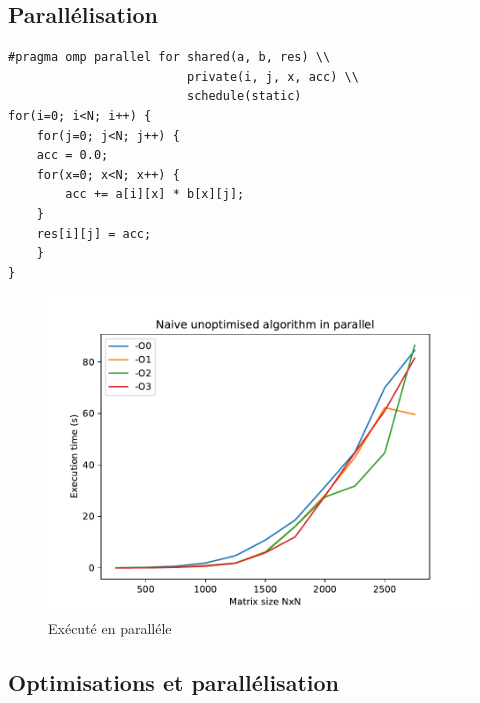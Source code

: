 \documentclass {article}
\begin{document}
\subsection{Parallélisation}

\begin{lstlisting}
#pragma omp parallel for shared(a, b, res) \\
                         private(i, j, x, acc) \\
                         schedule(static)
for(i=0; i<N; i++) {
    for(j=0; j<N; j++) { 
    acc = 0.0;
    for(x=0; x<N; x++) {
        acc += a[i][x] * b[x][j];
    }
    res[i][j] = acc;
    }
}
\end{lstlisting}

\begin{figure}[H]
    \includegraphics[width=\linewidth]{plot/parallel.pdf}
    \caption{Exécuté en paralléle}
    \label{fig:parallel}
\end{figure}

\subsection{Optimisations et parallélisation}
\end{document}
